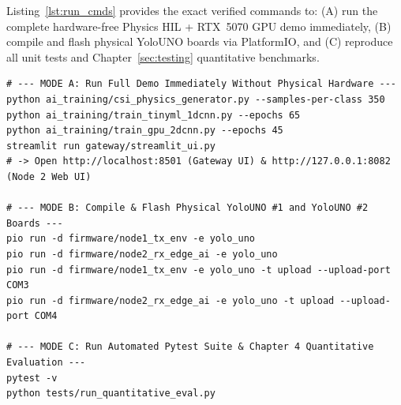 \documentclass{hcmut-report}
\begin{document}
Listing~\ref{lst:run_cmds} provides the exact verified commands to: (A) run the complete hardware-free Physics HIL + RTX~5070 GPU demo immediately, (B) compile and flash physical YoloUNO boards via PlatformIO, and (C) reproduce all unit tests and Chapter~\ref{sec:testing} quantitative benchmarks.

\begin{lstlisting}[caption={Build, Flash, Live Dashboard Demo, and Automated Test Commands},label={lst:run_cmds}]
# --- MODE A: Run Full Demo Immediately Without Physical Hardware ---
python ai_training/csi_physics_generator.py --samples-per-class 350
python ai_training/train_tinyml_1dcnn.py --epochs 65
python ai_training/train_gpu_2dcnn.py --epochs 45
streamlit run gateway/streamlit_ui.py
# -> Open http://localhost:8501 (Gateway UI) & http://127.0.0.1:8082 (Node 2 Web UI)

# --- MODE B: Compile & Flash Physical YoloUNO #1 and YoloUNO #2 Boards ---
pio run -d firmware/node1_tx_env -e yolo_uno
pio run -d firmware/node2_rx_edge_ai -e yolo_uno
pio run -d firmware/node1_tx_env -e yolo_uno -t upload --upload-port COM3
pio run -d firmware/node2_rx_edge_ai -e yolo_uno -t upload --upload-port COM4

# --- MODE C: Run Automated Pytest Suite & Chapter 4 Quantitative Evaluation ---
pytest -v
python tests/run_quantitative_eval.py
\end{lstlisting}
\end{document}
